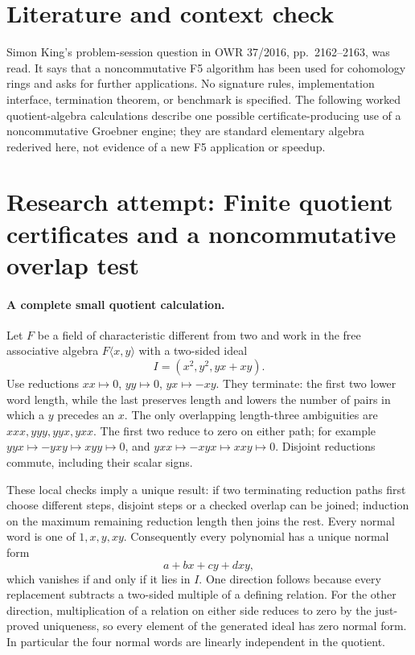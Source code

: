 \documentclass[11pt]{article}
\begin{document}
\section{Literature and context check}
Simon King's problem-session question in OWR 37/2016, pp.~2162--2163, was read. It says that a noncommutative F5 algorithm has been used for cohomology rings and asks for further applications. No signature rules, implementation interface, termination theorem, or benchmark is specified. The following worked quotient-algebra calculations describe one possible certificate-producing use of a noncommutative Groebner engine; they are standard elementary algebra rederived here, not evidence of a new F5 application or speedup.
\section{Research attempt: Finite quotient certificates and a noncommutative overlap test}

\paragraph{A complete small quotient calculation.}
Let $F$ be a field of characteristic different from two and work in the free associative algebra $F\langle x,y\rangle$ with a two-sided ideal
\[
 I=(x^2,y^2,yx+xy).
\]
Use reductions $xx\mapsto0$, $yy\mapsto0$, $yx\mapsto-xy$. They terminate: the first two lower word length, while the last preserves length and lowers the number of pairs in which a $y$ precedes an $x$. The only overlapping length-three ambiguities are $xxx,yyy,yyx,yxx$. The first two reduce to zero on either path; for example $yyx\mapsto-yxy\mapsto xyy\mapsto0$, and $yxx\mapsto-xyx\mapsto xxy\mapsto0$. Disjoint reductions commute, including their scalar signs.

These local checks imply a unique result: if two terminating reduction paths first choose different steps, disjoint steps or a checked overlap can be joined; induction on the maximum remaining reduction length then joins the rest. Every normal word is one of $1,x,y,xy$. Consequently every polynomial has a unique normal form
\[
 a+bx+cy+dxy,
\]
which vanishes if and only if it lies in $I$. One direction follows because every replacement subtracts a two-sided multiple of a defining relation. For the other direction, multiplication of a relation on either side reduces to zero by the just-proved uniqueness, so every element of the generated ideal has zero normal form. In particular the four normal words are linearly independent in the quotient.
\end{document}
